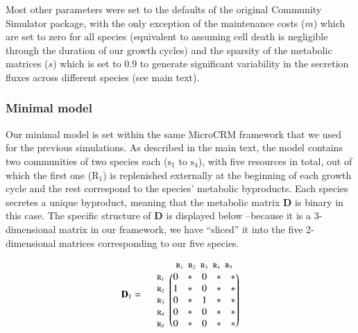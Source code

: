 \documentclass[a4paper,10pt]{article}
\begin{document}
Most other parameters were set to the defaults of the original Community Simulator
package, with the only exception of the maintenance costs ($m$) which are set to
zero for all species
(equivalent to assuming cell death is negligible through the duration of our growth cycles)
and the sparsity of the metabolic matrices ($s$) which is set to 0.9
to generate significant variability in the secretion fluxes across different species
(see main text).

\subsubsection*{Minimal model}\label{methods:sim-min}

Our minimal model is set within the same MicroCRM framework that we used
for the previous simulations.
As described in the main text, the model contains two communities
of two species each
($\mathrm{s}_1$ to $\mathrm{s}_4$),
with five resources in total, out of which the first one ($\mathrm{R}_1$)
is replenished externally at the beginning of each growth cycle
and the rest correspond to the species' metabolic byproducts.
Each species secretes a unique byproduct, meaning that the metabolic
matrix $\mathbf{D}$ is binary in this case.
The specific structure of $\mathbf{D}$ is displayed below
--because it is a 3-dimensional matrix in our framework,
we have ``sliced'' it into the five 2-dimensional matrices corresponding to
our five species.

\begin{equation*}
\mathbf{D}_1 = \; \; \; \; \; \begin{matrix}
 & 

\begin{matrix}
\text{\scriptsize $\mathrm{R}_1$} \!\!\! & 
\text{\scriptsize $\mathrm{R}_2$} \!\!\! & 
\text{\scriptsize $\mathrm{R}_3$} \!\!\! & 
\text{\scriptsize $\mathrm{R}_4$} \!\!\! & 
\text{\scriptsize $\mathrm{R}_5$}
\end{matrix}

\\ 

\begin{matrix*}[l]
\text{\scriptsize $\mathrm{R}_1$} \!\!\! \\
\text{\scriptsize $\mathrm{R}_2$} \!\!\! \\
\text{\scriptsize $\mathrm{R}_3$} \!\!\! \\
\text{\scriptsize $\mathrm{R}_4$} \!\!\! \\
\text{\scriptsize $\mathrm{R}_5$} \!\!\!
\end{matrix*}

& 

\begin{pmatrix}
0 & * & 0 & * & * \\
1 & * & 0 & * & * \\
0 & * & 1 & * & * \\
0 & * & 0 & * & * \\
0 & * & 0 & * & *
\end{pmatrix}

\end{matrix}
\end{equation*}
\end{document}
